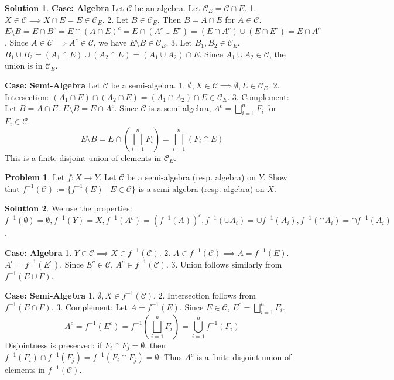 \documentclass[11pt]{article}
\theoremstyle{definition}
\newtheorem{problem}{Problem}
\newtheorem*{solution}{Solution}
\newcommand{\C}{\mathcal{C}}
\begin{document}
\begin{solution}
\textbf{Case: Algebra}
Let $\C$ be an algebra. Let $\C_E = \C \cap E$.
1. $X \in \C \implies X \cap E = E \in \C_E$.
2. Let $B \in \C_E$. Then $B = A \cap E$ for $A \in \C$.
   $E \setminus B = E \cap B^c = E \cap (A \cap E)^c = E \cap (A^c \cup E^c) = (E \cap A^c) \cup (E \cap E^c) = E \cap A^c$.
   Since $A \in \C \implies A^c \in \C$, we have $E \setminus B \in \C_E$.
3. Let $B_1, B_2 \in \C_E$. $B_1 \cup B_2 = (A_1 \cap E) \cup (A_2 \cap E) = (A_1 \cup A_2) \cap E$.
   Since $A_1 \cup A_2 \in \C$, the union is in $\C_E$.

\textbf{Case: Semi-Algebra}
Let $\C$ be a semi-algebra.
1. $\emptyset, X \in \C \implies \emptyset, E \in \C_E$.
2. Intersection: $(A_1 \cap E) \cap (A_2 \cap E) = (A_1 \cap A_2) \cap E \in \C_E$.
3. Complement: Let $B = A \cap E$.
   $E \setminus B = E \cap A^c$.
   Since $\C$ is a semi-algebra, $A^c = \bigsqcup_{i=1}^n F_i$ for $F_i \in \C$.
   \[ E \setminus B = E \cap \left( \bigsqcup_{i=1}^n F_i \right) = \bigsqcup_{i=1}^n (F_i \cap E) \]
   This is a finite disjoint union of elements in $\C_E$.
\end{solution}

\hrulefill

\begin{problem}
Let $f: X \to Y$. Let $\C$ be a semi-algebra (resp. algebra) on $Y$. Show that $f^{-1}(\C) := \{f^{-1}(E) \mid E \in \C\}$ is a semi-algebra (resp. algebra) on $X$.
\end{problem}

\begin{solution}
We use the properties: $f^{-1}(\emptyset)=\emptyset, f^{-1}(Y)=X, f^{-1}(A^c)=(f^{-1}(A))^c, f^{-1}(\cup A_i)=\cup f^{-1}(A_i), f^{-1}(\cap A_i)=\cap f^{-1}(A_i)$.

\textbf{Case: Algebra}
1. $Y \in \C \implies X \in f^{-1}(\C)$.
2. $A \in f^{-1}(\C) \implies A = f^{-1}(E)$. $A^c = f^{-1}(E^c)$. Since $E^c \in \C$, $A^c \in f^{-1}(\C)$.
3. Union follows similarly from $f^{-1}(E \cup F)$.

\textbf{Case: Semi-Algebra}
1. $\emptyset, X \in f^{-1}(\C)$.
2. Intersection follows from $f^{-1}(E \cap F)$.
3. Complement: Let $A = f^{-1}(E)$. Since $E \in \C$, $E^c = \bigsqcup_{i=1}^n F_i$.
   \[ A^c = f^{-1}(E^c) = f^{-1}\left(\bigsqcup_{i=1}^n F_i\right) = \bigcup_{i=1}^n f^{-1}(F_i) \]
   Disjointness is preserved: if $F_i \cap F_j = \emptyset$, then $f^{-1}(F_i) \cap f^{-1}(F_j) = f^{-1}(F_i \cap F_j) = \emptyset$.
   Thus $A^c$ is a finite disjoint union of elements in $f^{-1}(\C)$.
\end{solution}
\end{document}
